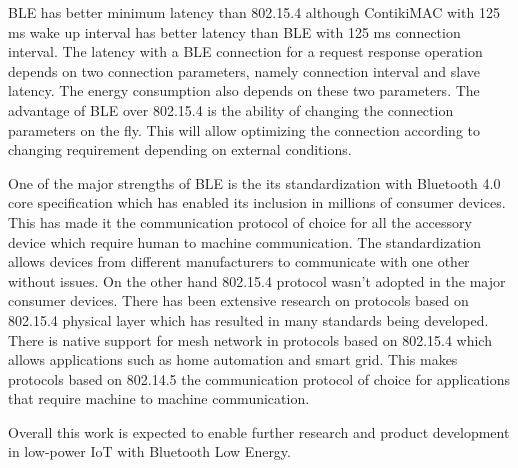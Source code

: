BLE has better minimum latency than 802.15.4 although ContikiMAC with 125 ms wake up interval has better latency than BLE with 125 ms connection interval. The latency with a BLE connection for a request response operation depends on two connection parameters, namely connection interval and slave latency. The energy consumption also depends on these two parameters. The advantage of BLE over 802.15.4 is the ability of changing the connection parameters on the fly. This will allow optimizing the connection according to changing requirement depending on external conditions. 


One of the major strengths of BLE is the its standardization with Bluetooth 4.0 core specification which has enabled its inclusion in millions of consumer devices. This has made it the communication protocol of choice for all the accessory device which require human to machine communication. The standardization allows devices from different manufacturers to communicate with one other without issues. On the other hand 802.15.4 protocol wasn't adopted in the major consumer devices. There has been extensive research on protocols based on 802.15.4 physical layer which has resulted in many standards being developed. There is native support for mesh network in protocols based on 802.15.4 which allows applications such as home automation and smart grid. This makes protocols based on 802.14.5 the communication protocol of choice for applications that require machine to machine communication.

Overall this work is expected to enable further research and product development in low-power IoT with Bluetooth Low Energy.

